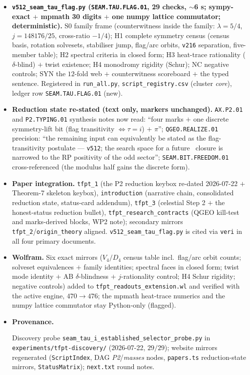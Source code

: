 \begin{itemize}[leftmargin=1.5em]
\item \textbf{\texttt{v512\_seam\_tau\_flag.py} (\texttt{SEAM.TAU.FLAG.01}, 29 checks, $\sim$6 s;
sympy-exact $+$ mpmath 30 digits $+$ one numpy lattice commutator; deterministic).} S0 family
frame (counterwitness inside the family: $\lambda=5/4$, $j=148176/25$, cross-ratio $-1/4$); H1
complete symmetry census (census basis, rotation solvesets, stabiliser jump, flag/arc orbits,
\texttt{v216} separation, five-member table); H2 spectral criteria in closed form; H3 heat-trace
rationality ($\delta$-blind) $+$ twist existence; H4 monodromy rigidity (Schur); NC negative
controls; SYN the $12$-fold web $+$ counterwitness scoreboard $+$ the typed sentence. Registered
in \texttt{run\_all.py}, \texttt{script\_registry.csv} (cluster \emph{core}), ledger row
\texttt{SEAM.TAU.FLAG.01} (new).
\item \textbf{Reduction state re-stated (text only, markers unchanged).} \texttt{AX.P2.01} and
\texttt{P2.TYPING.01} synthesis notes now read: ``four marks $+$ one discrete symmetry-lift bit
(flag transitivity $\iff\tau=i$) $+$ $\pi$''; \texttt{QGEO.REALIZE.01} precision: ``the remaining
input can equivalently be stated as the flag-transitivity postulate --- \texttt{v512}; the search
space for a future \mE\ closure is narrowed to the RP positivity of the odd sector'';
\texttt{SEAM.BIT.FREEDOM.01} cross-referenced (the modulus half gains the discrete form).
\item \textbf{Paper integration.} \texttt{tfpt\_1} (the P2 reduction keybox re-dated 2026-07-22
$+$ Theorem-7 skeleton keybox), \texttt{introduction} (narrative chain, consolidated reduction
state, status-card addendum), \texttt{tfpt\_3} (celestial Step 2 $+$ the honest-status reduction
bullet), \texttt{tfpt\_research\_contracts} (QGEO kill-test and marks-derived blocks, WP2 note);
secondary mirrors \texttt{tfpt\_2}/\texttt{origin\_theory} aligned.
\texttt{v512\_seam\_tau\_flag.py} is cited via \texttt{veri} in all four primary documents.
\item \textbf{Wolfram.} Six exact mirrors ($V_4/D_4$ census table incl.\ flag/arc orbit counts;
solveset equivalences $+$ family identities; spectral faces in closed form; twist mode identity
$+$ AB $\delta$-blindness $+$ $j$-rationality control; H4 Schur rigidity; negative controls) added
to \texttt{tfpt\_readouts\_extension.wl} and verified with the active engine, $470\to476$; the
mpmath heat-trace numerics and the numpy lattice commutator stay Python-only (flagged).
\item \textbf{Provenance.} \begingroup\raggedright Discovery probe
\texttt{seam\_tau\_i\_established\_selector\_probe.py}
in \texttt{experiments/tfpt-discovery/} (2026-07-22,
$29/29$); website mirrors regenerated (\texttt{ScriptIndex}, DAG \emph{P2}/\emph{masses} nodes,
\texttt{papers.ts} reduction-state mirrors, \texttt{StatusMatrix}); \texttt{next.txt} round
notes.\par\endgroup
\end{itemize}


